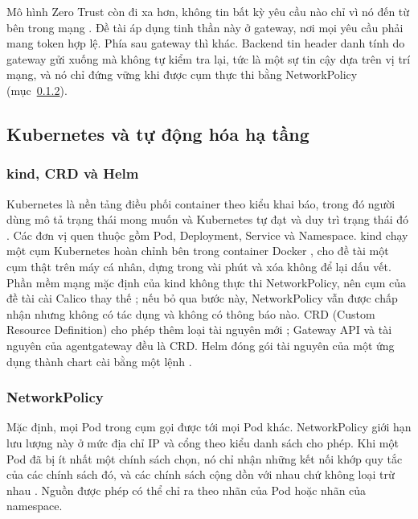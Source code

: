 Mô hình Zero Trust còn đi xa hơn, không tin bất kỳ yêu cầu nào chỉ vì nó đến từ bên trong mạng \parencite{nist80207}. Đề tài áp dụng tinh thần này ở gateway, nơi mọi yêu cầu phải mang token hợp lệ. Phía sau gateway thì khác. Backend tin header danh tính do gateway gửi xuống mà không tự kiểm tra lại, tức là một sự tin cậy dựa trên vị trí mạng, và nó chỉ đứng vững khi được cụm thực thi bằng NetworkPolicy (mục~\ref{sec:ch3-netpol}).

\subsection{Kubernetes và tự động hóa hạ tầng}

\subsubsection{kind, CRD và Helm}

Kubernetes là nền tảng điều phối container theo kiểu khai báo, trong đó người dùng mô tả trạng thái mong muốn và Kubernetes tự đạt và duy trì trạng thái đó \parencite{k8s_overview}. Các đơn vị quen thuộc gồm Pod, Deployment, Service và Namespace. kind chạy một cụm Kubernetes hoàn chỉnh bên trong container Docker \parencite{kind_docs}, cho đề tài một cụm thật trên máy cá nhân, dựng trong vài phút và xóa không để lại dấu vết. Phần mềm mạng mặc định của kind không thực thi NetworkPolicy, nên cụm của đề tài cài Calico thay thế \parencite{calico_docs}; nếu bỏ qua bước này, NetworkPolicy vẫn được chấp nhận nhưng không có tác dụng và không có thông báo nào. CRD (Custom Resource Definition) cho phép thêm loại tài nguyên mới \parencite{k8s_crd}; Gateway API và tài nguyên của agentgateway đều là CRD. Helm đóng gói tài nguyên của một ứng dụng thành chart cài bằng một lệnh \parencite{helm_docs}.

\subsubsection{NetworkPolicy}\label{sec:ch3-netpol}

Mặc định, mọi Pod trong cụm gọi được tới mọi Pod khác. NetworkPolicy giới hạn lưu lượng này ở mức địa chỉ IP và cổng theo kiểu danh sách cho phép. Khi một Pod đã bị ít nhất một chính sách chọn, nó chỉ nhận những kết nối khớp quy tắc của các chính sách đó, và các chính sách cộng dồn với nhau chứ không loại trừ nhau \parencite{k8s_netpol}. Nguồn được phép có thể chỉ ra theo nhãn của Pod hoặc nhãn của namespace.

